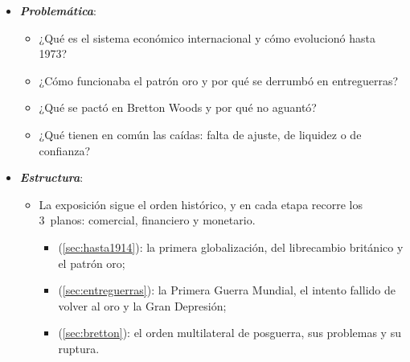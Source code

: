 \documentclass[11pt]{article}
\begin{document}
\begin{itemize}
\item \textbf{\emph{Problemática}}:
  \begin{itemize}
  \item ¿Qué es el sistema económico internacional y cómo evolucionó hasta 1973?
  \item ¿Cómo funcionaba el patrón oro y por qué se derrumbó en entreguerras?
  \item ¿Qué se pactó en Bretton Woods y por qué no aguantó?
  \item ¿Qué tienen en común las caídas: falta de ajuste, de liquidez o de confianza?
  \end{itemize}

\item \textbf{\emph{Estructura}}:
  \begin{itemize}
  \item La exposición sigue el orden histórico, y en cada etapa recorre los 3~planos: comercial, financiero y monetario.
    \begin{itemize}
    \item {} (\ref{sec:hasta1914}): la primera globalización, del librecambio británico y el patrón oro;
    \item {} (\ref{sec:entreguerras}): la Primera Guerra Mundial, el intento fallido de volver al oro y la Gran Depresión;
    \item {} (\ref{sec:bretton}): el orden multilateral de posguerra, sus problemas y su ruptura.
    \end{itemize}
  \end{itemize}
\end{itemize}

\begin{infografia}[H]
\centering
\caption{El sistema económico internacional, 1815-1973}\label{figu:cronologia}
\end{infografia}
\end{document}
